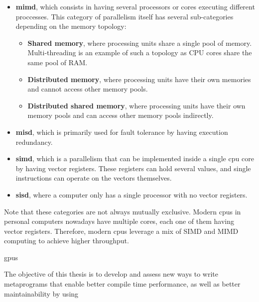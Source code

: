 \documentclass[main]{subfiles}
\begin{document}
\begin{itemize}
\item
\textbf{\gls{mimd}}, which consists in having several processors or cores
executing different proccesses. This category of parallelism itself has several
sub-categories depending on the memory topology:

  \begin{itemize}
  \item \textbf{Shared memory}, where processing units share a single
  pool of memory. Multi-threading is an example of such a topology as
  CPU cores share the same pool of RAM.
  \item \textbf{Distributed memory}, where processing units have their own
  memories and cannot access other memory pools.
  \item \textbf{Distributed shared memory}, where processing units have their
  own memory pools and can access other memory pools indirectly.
  \end{itemize}

\item
\textbf{\gls{misd}}, which is primarily used for fault tolerance by having
execution redundancy.

\item
\textbf{\gls{simd}}, which is a parallelism that can be implemented inside
a single \gls{cpu} core by having vector registers. These registers can hold
several values, and single instructions can operate on the vectors themselves.

\item
\textbf{\gls{sisd}}, where a computer only has a single processor with no
vector registers.

\end{itemize}

Note that these categories are not always mutually exclusive.
Modern \glspl{cpu} in personal computers nowadays have multiple cores,
each one of them having vector registers. Therefore, modern \glspl{cpu}
leverage a mix of SIMD and MIMD computing to achieve higher throughput.

\glspl{gpu}



The objective of this thesis is to develop and assess new ways to write
\cpp metaprograms that enable better compile time performance, as well as
better maintainability by using


\end{document}
